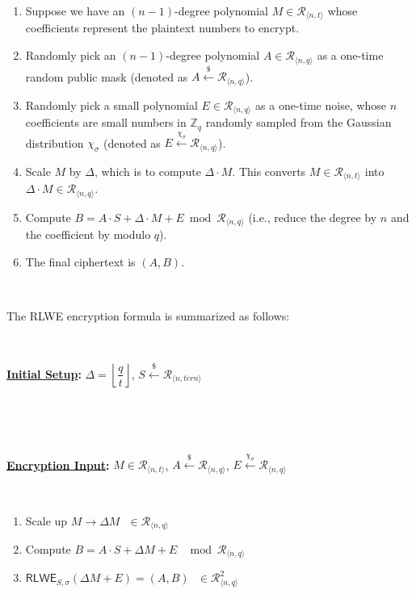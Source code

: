 \begin{enumerate}
\item Suppose we have an $(n-1)$-degree polynomial $M \in \mathcal{R}_{\langle n, t \rangle}$ whose coefficients represent the plaintext numbers to encrypt. 
\item Randomly pick an $(n-1)$-degree polynomial $A \in \mathcal{R}_{\langle n,q \rangle}$ as a one-time random public mask (denoted as $A \xleftarrow{\$} \mathcal{R}_{\langle n, q \rangle}$). 
\item Randomly pick a small polynomial $E \in \mathcal{R}_{\langle n,q \rangle}$ as a one-time noise, whose $n$ coefficients are small numbers in $\mathbb{Z}_q$ randomly sampled from the Gaussian distribution $\chi_\sigma$ (denoted as $E \xleftarrow{\chi_\sigma} \mathcal{R}_{\langle n, q \rangle}$). 
\item Scale $M$ by $\Delta$, which is to compute $\Delta \cdot M$. This converts $M \in \mathcal{R}_{\langle n,t \rangle}$ into $\Delta \cdot M \in \mathcal{R}_{\langle n,q \rangle}$.
\item Compute $B = A \cdot S + \Delta \cdot M + E \bmod \mathcal{R}_{\langle n,q \rangle}$ (i.e., reduce the degree by $n$ and the coefficient by modulo $q$). 
\item The final ciphertext is $(A, B)$.
\end{enumerate}

$ $

The RLWE encryption formula is summarized as follows:

$ $
\begin{tcolorbox}[title={\textbf{\tboxlabel{\ref*{subsec:rlwe-enc}} RLWE Encryption}}]
\textbf{\underline{Initial Setup}:} $\Delta = \left\lfloor\dfrac{q}{t}\right\rfloor$, $S \xleftarrow{\$} \mathcal{R}_{\langle n, \textit{tern} \rangle}$

$ $

$ $

\textbf{\underline{Encryption Input}:} $M \in \mathcal{R}_{\langle n, t \rangle}$, $A \xleftarrow{\$} \mathcal{R}_{\langle n, q \rangle}$, $E \xleftarrow{\chi_\sigma} \mathcal{R}_{\langle n, q \rangle}$

$ $

\begin{enumerate}
\item Scale up $M \longrightarrow \Delta  M \text{ } \in \mathcal{R}_{\langle n, q \rangle}$
\item Compute $B = A \cdot S + \Delta  M + E  \text{ } \bmod \mathcal{R}_{\langle n,q \rangle}$
\item $\textsf{RLWE}_{S,\sigma}(\Delta  M + E) = (A, B) \text{ } \in \mathcal{R}_{\langle n,q \rangle}^2$
\end{enumerate}

\end{tcolorbox}

